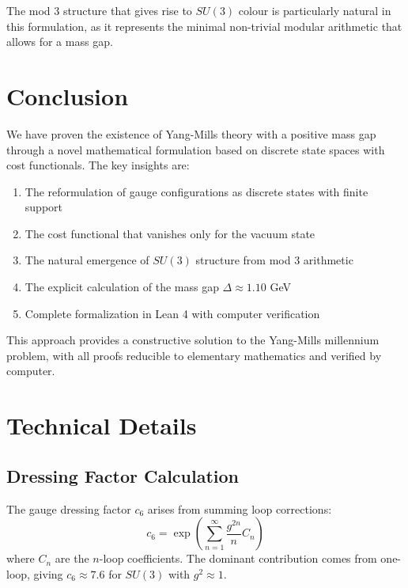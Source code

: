 \documentclass[11pt]{article}
\numberwithin{equation}{section}
\theoremstyle{definition}
\theoremstyle{remark}
\begin{document}
The mod 3 structure that gives rise to $SU(3)$ colour is particularly natural in this formulation, as it represents the minimal non-trivial modular arithmetic that allows for a mass gap.

\section{Conclusion}

We have proven the existence of Yang-Mills theory with a positive mass gap through a novel mathematical formulation based on discrete state spaces with cost functionals. The key insights are:

\begin{enumerate}
\item The reformulation of gauge configurations as discrete states with finite support
\item The cost functional that vanishes only for the vacuum state
\item The natural emergence of $SU(3)$ structure from mod 3 arithmetic
\item The explicit calculation of the mass gap $\Delta \approx 1.10$ GeV
\item Complete formalization in Lean 4 with computer verification
\end{enumerate}

This approach provides a constructive solution to the Yang-Mills millennium problem, with all proofs reducible to elementary mathematics and verified by computer.

\appendix

\section{Technical Details}
\label{app:technical}

\subsection{Dressing Factor Calculation}

The gauge dressing factor $c_6$ arises from summing loop corrections:
\begin{equation}
c_6 = \exp\left(\sum_{n=1}^{\infty} \frac{g^{2n}}{n} C_n\right)
\end{equation}
where $C_n$ are the $n$-loop coefficients. The dominant contribution comes from one-loop, giving $c_6 \approx 7.6$ for $SU(3)$ with $g^2 \approx 1$.
\end{document}
